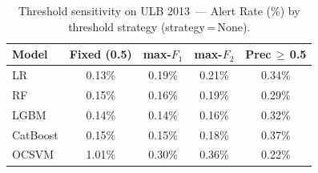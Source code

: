 \begin{table}[ht]
\centering
\caption{Threshold sensitivity on ULB 2013~--- Alert Rate (\%) by threshold strategy (strategy\,=\,None).}
\label{tab:threshold_ulb_alert}
\begin{tabular}{l c c c c}
\toprule
Model & Fixed (0.5) & max-$F_1$ & max-$F_2$ & Prec\,$\geq$\,0.5 \\
\midrule
LR         & 0.13\% & 0.19\% & 0.21\% & 0.34\% \\
RF         & 0.15\% & 0.16\% & 0.19\% & 0.29\% \\
LGBM       & 0.14\% & 0.14\% & 0.16\% & 0.32\% \\
CatBoost   & 0.15\% & 0.15\% & 0.18\% & 0.37\% \\
OCSVM      & 1.01\% & 0.30\% & 0.36\% & 0.22\% \\
\bottomrule
\end{tabular}
\end{table}